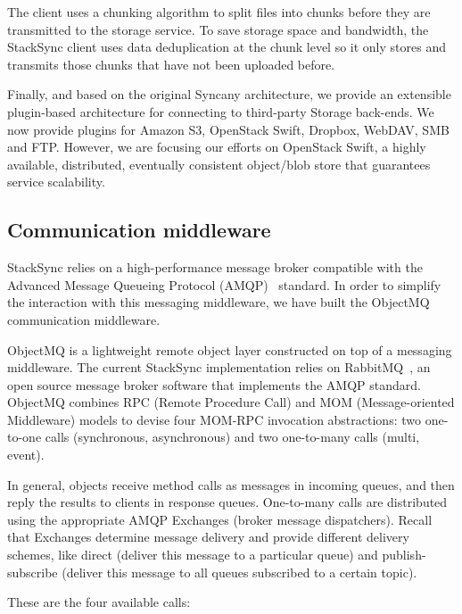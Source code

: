The client uses a chunking algorithm to split files into chunks before they are transmitted to the storage service. To save storage space and bandwidth, the StackSync client uses data deduplication at the chunk level so it only stores and transmits those chunks that have not been uploaded before. 


Finally, and based on the original Syncany architecture, we provide an extensible plugin-based architecture for connecting to third-party Storage back-ends. We now provide plugins for Amazon S3, OpenStack Swift, Dropbox, WebDAV, SMB and FTP. However, we are focusing our efforts on OpenStack Swift, a highly available, distributed, eventually consistent object/blob store that guarantees service scalability.


\subsection{Communication middleware}

StackSync relies on a high-performance message broker compatible with the Advanced Message Queueing Protocol (AMQP)~\cite{amqp} standard. In order to simplify the interaction with this messaging middleware, we have built the ObjectMQ communication middleware.


ObjectMQ is a lightweight remote object layer constructed on top of a messaging
middleware. The current StackSync implementation relies on RabbitMQ~\cite{rabbitmq}, an open source message broker software that implements the AMQP standard. ObjectMQ combines RPC (Remote Procedure Call) and MOM (Message-oriented Middleware) models to devise four MOM-RPC invocation abstractions: two one-to-one calls (synchronous, asynchronous) and two one-to-many calls (multi, event).


In general, objects receive method calls as messages in incoming queues, and then reply the results to clients in response queues. One-to-many calls are distributed using the appropriate AMQP Exchanges (broker message dispatchers). Recall that Exchanges determine message delivery and provide different delivery schemes, like direct (deliver this message to a particular queue) and publish-subscribe (deliver this message to all queues subscribed to a certain topic). 

These are the four available calls:

